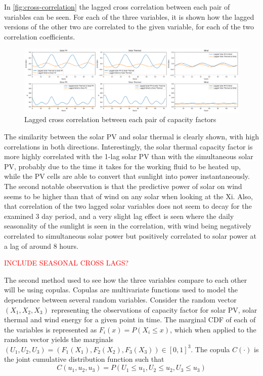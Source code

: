 In \autoref{fig:cross-correlation} the lagged cross correlation between each pair of variables can be seen. For each of the three variables, it is shown how the lagged versions of the other two are correlated to the given variable, for each of the two correlation coefficients. 

\begin{figure}[ht]
    \centering
    \captionsetup{justification=centering}
    \includegraphics[width=\linewidth]{assets/cross-correlation.png}
    \caption{Lagged cross correlation between each pair of capacity factors}
    \label{fig:cross-correlation}
\end{figure}

The similarity between the solar PV and solar thermal is clearly shown, with high correlations in both directions. Interestingly, the solar thermal capacity factor is more highly correlated with the 1-lag solar PV than with the simultaneous solar PV, probably due to the time it takes for the working fluid to be heated up, while the PV cells are able to convert that sunlight into power instantaneously. The second notable observation is that the predictive power of solar on wind seems to be higher than that of wind on any solar when looking at the Xi. Also, that correlation of the two lagged solar variables does not seem to decay for the examined 3 day period, and a very slight lag effect is seen where the daily seasonality of the sunlight is seen in the correlation, with wind being negatively correlated to simultaneous solar power but positively correlated to solar power at a lag of around 8 hours. 

\textcolor{red}{INCLUDE SEASONAL CROSS LAGS?}

The second method used to see how the three variables compare to each other will be using copulas. Copulas are multivariate functions used to model the dependence between several random variables. Consider the random vector $(X_1,X_2,X_3)$ representing the observations of capacity factor for solar PV, solar thermal and wind energy for a given point in time. The marginal CDF of each of the variables is represented as $F_i\left(x\right)=P\left(X_i\leq x\right)$, which when applied to the random vector yields the marginals $\left(U_1,U_2,U_3\right)=\left(F_1\left(X_1\right),F_2\left(X_2\right),F_3\left(X_3\right)\right)\in \left[0,1\right]^3$. The copula $C(\cdot)$ is the joint cumulative distribution function such that 
\begin{equation}
    C\left(u_1,u_2,u_3\right)=P\left(U_1\leq u_1,U_2\leq u_2,U_3\leq u_3\right)
\end{equation}

